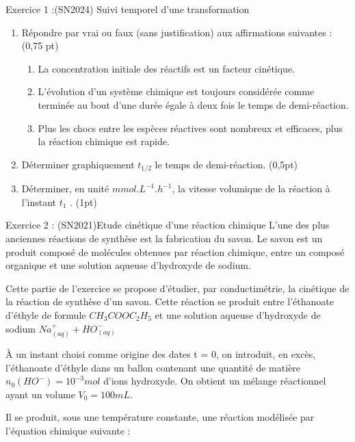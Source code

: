 \documentclass[12pt, french]{article}
\begin{document}
\begin{Box2}{Exercice 1 :(SN2024)  Suivi temporel d’une transformation}
\begin{enumerate}
  \item Répondre par vrai ou faux (sans justification) aux
affirmations suivantes : (0,75 pt)
\begin{enumerate}
  \item La concentration initiale des réactifs est un facteur cinétique.
  \item L’évolution d’un système chimique est toujours considérée
comme terminée au bout d’une durée égale à deux fois le temps
de demi-réaction.
\item Plus les chocs entre les espèces réactives sont nombreux et
efficaces, plus la réaction chimique est rapide.
\end{enumerate}
\item Déterminer graphiquement $t_{1/2}$ le temps de demi-réaction. (0,5pt)
\item Déterminer, en unité $mmol.L^{-1}.h^{-1}$, la vitesse volumique de la réaction à l’instant $t_1$ . (1pt)
\end{enumerate}
   \end{Box2}


\begin{Box2}{Exercice 2 : (SN2021)Etude cinétique d’une réaction chimique}
L’une des plus anciennes réactions de synthèse est la fabrication du savon. Le savon est un produit
composé de molécules obtenues par réaction chimique, entre un composé organique et une solution
aqueuse d'hydroxyde de sodium.

Cette partie de l’exercice se propose d’étudier, par conductimétrie, la cinétique de la réaction de
synthèse d’un savon. Cette réaction se produit entre l’éthanoate d’éthyle de formule
  $CH_3COOC_2H_5$ et une solution aqueuse d’hydroxyde de sodium $Na_{(aq)}^{+} + HO^-_{(aq)}$

  À un instant choisi comme origine des dates t = 0, on introduit, en excès, l’éthanoate d’éthyle dans un
ballon contenant une quantité de matière $n_0(HO^-) = 10^{-3} mol$ d’ions hydroxyde. On obtient un
mélange réactionnel ayant un volume $V_0 = 100mL$.

Il se produit, sous une température constante, une réaction modélisée par l’équation chimique
  suivante :  

\end{Box2}
\end{document}
